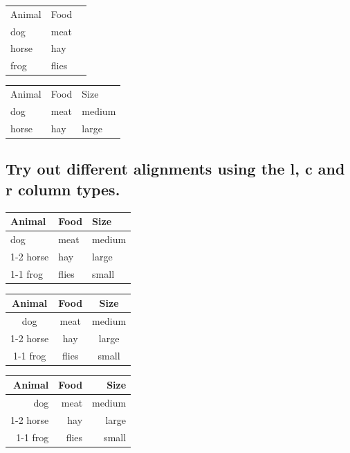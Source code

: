 \documentclass{article}
\begin{document}
\vspace{2em}

 \begin{tabular}{lll}
 Animal & Food  \\
 dog & meat  \\
 horse & hay  \\
 frog & flies \\
 \end{tabular}

\vspace{2em}

 \begin{tabular}{lll}
 Animal & Food & Size \\
 dog & meat & medium \\
 horse & hay & large \\
 \end{tabular}


\subsection*{ Try out different alignments using the l, c and r column types.}


 \begin{tabular}{lll}
 \toprule
 Animal & Food & Size \\
 \midrule
 dog & meat & medium \\
 \cmidrule{1-2}
 horse & hay & large \\
 \cmidrule{1-1}
 \cmidrule{3-3}
 frog & flies & small \\
 \bottomrule
 \end{tabular}

\vspace{2em}

 \begin{tabular}{ccc}
 \toprule
 Animal & Food & Size \\
 \midrule
 dog & meat & medium \\
 \cmidrule{1-2}
 horse & hay & large \\
 \cmidrule{1-1}
 \cmidrule{3-3}
 frog & flies & small \\
 \bottomrule
 \end{tabular}


 \begin{tabular}{rrr}
 \toprule
 Animal & Food & Size \\
 \midrule
 dog & meat & medium \\
 \cmidrule{1-2}
 horse & hay & large \\
 \cmidrule{1-1}
 \cmidrule{3-3}
 frog & flies & small \\
 \bottomrule
 \end{tabular}
\end{document}
